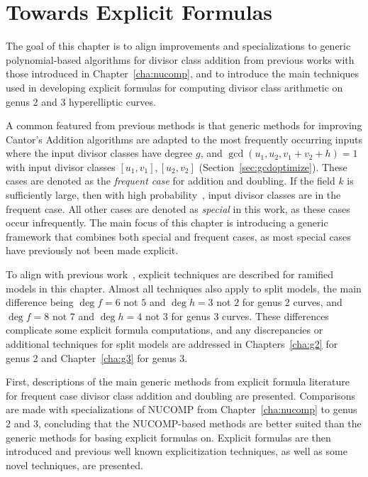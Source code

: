 
\chapter{Towards Explicit Formulas}
\label{cha:towardsExplicit}
The goal of this chapter is to align improvements and specializations to generic
polynomial-based algorithms for divisor class addition from previous works with
those introduced in Chapter~\ref{cha:nucomp}, and to introduce the main
techniques used in developing explicit formulas for computing divisor class
arithmetic on genus 2 and 3 hyperelliptic curves. 

A common featured from previous methods is that generic methods for improving
Cantor's Addition algorithms are adapted to the most frequently occurring
inputs where the input divisor classes have degree $g$, and $\gcd(u_1,u_2,v_1 +
v_2 + h) = 1$ with input divisor classes $[u_1,v_1],[u_2,v_2]$
(Section~\ref{sec:gcdoptimize}). These cases are denoted as the \emph{frequent
case} for addition and doubling. If the field $k$ is sufficiently large, then
with high probability~\cite{Lange_explicit_2005}, input divisor classes are in
the frequent case. All other cases are denoted as \emph{special} in this work,
as these cases occur infrequently. The main focus of this chapter is introducing
a generic framework that combines both special and frequent cases, as most
special cases have previously not been made explicit. 

To align with previous
work~\cite{Lange_explicit_2005,CostelloLauter_geo_2011,fan_g3_2006}, explicit
techniques are described for ramified models in this chapter. Almost all
techniques also apply to split models, the main difference being $\deg f =
6$ not $5$ and $\deg h = 3$ not $2$ for genus 2 curves, and $\deg f = 8$ not
$7$ and $\deg h = 4$ not $3$ for genus 3 curves. These differences
complicate some explicit formula computations, and any discrepancies or additional
techniques for split models are addressed in Chapters~\ref{cha:g2} for
genus 2 and Chapter~\ref{cha:g3} for genus 3. 

First, descriptions of the main generic methods from explicit formula literature
for frequent case divisor class addition and doubling are presented. Comparisons
are made with specializations of NUCOMP from Chapter~\ref{cha:nucomp} to genus
2 and 3, concluding that the NUCOMP-based methods are better suited than the
generic methods for basing explicit formulas on. Explicit formulas are then
introduced and previous well known explicitization techniques, as well as some novel
techniques, are presented.

